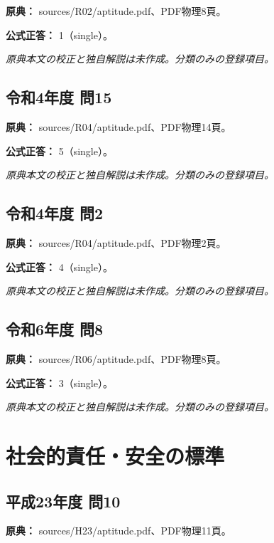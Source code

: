 \noindent\textbf{原典：} sources/R02/aptitude.pdf、PDF物理8頁。

\textbf{公式正答：} 1（single）。

\par\textit{原典本文の校正と独自解説は未作成。分類のみの登録項目。}

\subsection{令和4年度 問15}
\label{q:r04-reg-apt-15}

\noindent\textbf{原典：} sources/R04/aptitude.pdf、PDF物理14頁。

\textbf{公式正答：} 5（single）。

\par\textit{原典本文の校正と独自解説は未作成。分類のみの登録項目。}

\subsection{令和4年度 問2}
\label{q:r04-reg-apt-02}

\noindent\textbf{原典：} sources/R04/aptitude.pdf、PDF物理2頁。

\textbf{公式正答：} 4（single）。

\par\textit{原典本文の校正と独自解説は未作成。分類のみの登録項目。}

\subsection{令和6年度 問8}
\label{q:r06-reg-apt-08}

\noindent\textbf{原典：} sources/R06/aptitude.pdf、PDF物理8頁。

\textbf{公式正答：} 3（single）。

\par\textit{原典本文の校正と独自解説は未作成。分類のみの登録項目。}

\section{社会的責任・安全の標準}

\subsection{平成23年度 問10}
\label{q:h23-reg-apt-10}

\noindent\textbf{原典：} sources/H23/aptitude.pdf、PDF物理11頁。

